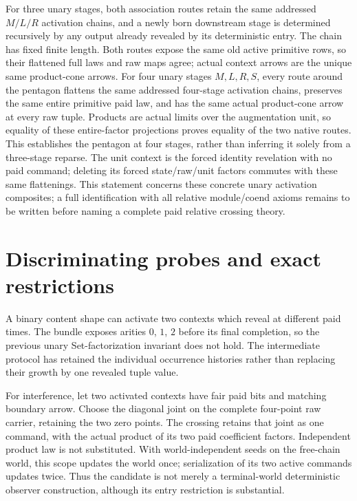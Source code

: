 \documentclass[11pt]{article}\usepackage{amsmath,amssymb,amsthm,geometry}\geometry{margin=1in}
\begin{document}
For three unary stages, both association routes retain the same addressed $M/L/R$ activation chains, and a newly born downstream stage is determined recursively by any output already revealed by its deterministic entry. The chain has fixed finite length. Both routes expose the same old active primitive rows, so their flattened full laws and raw maps agree; actual context arrows are the unique same product-cone arrows. For four unary stages $M,L,R,S$, every route around the pentagon flattens the same addressed four-stage activation chains, preserves the same entire primitive paid law, and has the same actual product-cone arrow at every raw tuple. Products are actual limits over the augmentation unit, so equality of these entire-factor projections proves equality of the two native routes. This establishes the pentagon at four stages, rather than inferring it solely from a three-stage reparse. The unit context is the forced identity revelation with no paid command; deleting its forced state/raw/unit factors commutes with these same flattenings. This statement concerns these concrete unary activation composites; a full identification with all relative module/coend axioms remains to be written before naming a complete paid relative crossing theory.

\section{Discriminating probes and exact restrictions}
A binary content shape can activate two contexts which reveal at different paid times. The bundle exposes arities $0$, $1$, $2$ before its final completion, so the previous unary Set-factorization invariant does not hold. The intermediate protocol has retained the individual occurrence histories rather than replacing their growth by one revealed tuple value.

For interference, let two activated contexts have fair paid bits and matching boundary arrow. Choose the diagonal joint on the complete four-point raw carrier, retaining the two zero points. The crossing retains that joint as one command, with the actual product of its two paid coefficient factors. Independent product law is not substituted. With world-independent seeds on the free-chain world, this scope updates the world once; serialization of its two active commands updates twice. Thus the candidate is not merely a terminal-world deterministic observer construction, although its entry restriction is substantial.
\end{document}
